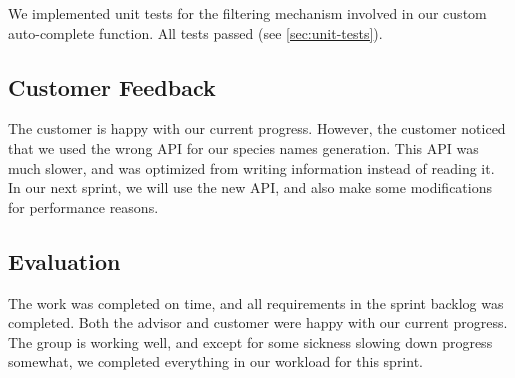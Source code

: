 	We implemented unit tests for the filtering mechanism involved in our custom
	auto-complete function. All tests passed (see \ref{sec:unit-tests}).

\subsection{Customer Feedback}
The customer is happy with our current progress. However, the customer noticed that we used the wrong API for our species names generation. This API was much slower, and was optimized from writing information instead of reading it. In our next sprint, we will use the new API, and also make some modifications for performance reasons. 

\subsection{Evaluation}
The work was completed on time, and all requirements in the sprint backlog was completed. Both the advisor and customer were happy with our current progress. The group is working well, and except for some sickness slowing down progress somewhat, we completed everything in our workload for this sprint.
